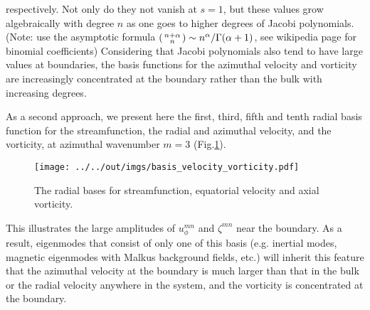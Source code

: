 respectively. Not only do they not vanish at $s=1$, but these values grow algebraically with degree $n$ as one goes to higher degrees of Jacobi polynomials. (Note: use the asymptotic formula $\begin{psmallmatrix} n+\alpha \\ n \end{psmallmatrix} \sim n^\alpha/\Gamma(\alpha + 1)$, see wikipedia page for binomial coefficients) 
Considering that Jacobi polynomials also tend to have large values at boundaries, the basis functions for the azimuthal velocity and vorticity are increasingly concentrated at the boundary rather than the bulk with increasing degrees.

As a second approach, we present here the first, third, fifth and tenth radial basis function for the streamfunction, the radial and azimuthal velocity, and the vorticity, at azimuthal wavenumber $m=3$ (Fig.\ref{fig:rad-basis}). 
\begin{figure}[htbp]
    \centering
    \texttt{[image: ../../out/imgs/basis\_velocity\_vorticity.pdf]}
    \caption{The radial bases for streamfunction, equatorial velocity and axial vorticity.}
    \label{fig:rad-basis}
\end{figure}
This illustrates the large amplitudes of $u_\phi^{mn}$ and $\zeta^{mn}$ near the boundary.
As a result, eigenmodes that consist of only one of this basis (e.g. inertial modes, magnetic eigenmodes with Malkus background fields, etc.) will inherit this feature that the azimuthal velocity at the boundary is much larger than that in the bulk or the radial velocity anywhere in the system, and the vorticity is concentrated at the boundary.

\clearpage
